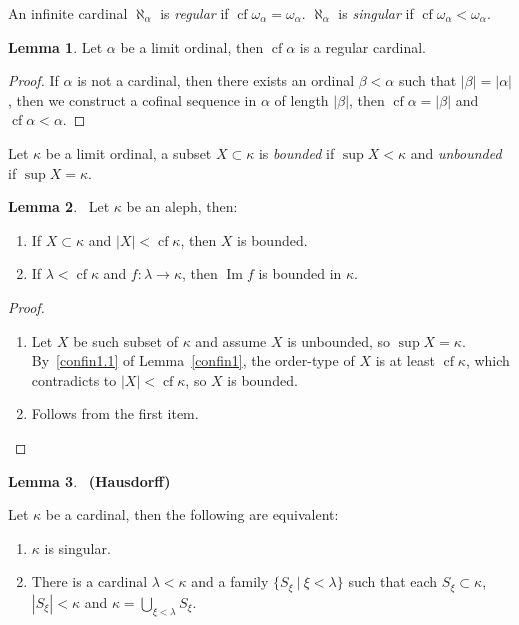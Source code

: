 \documentclass[8pt]{article}
\theoremstyle{definition}
\theoremstyle{definition}
\theoremstyle{definition}
\theoremstyle{definition}
\theoremstyle{definition}
\theoremstyle{definition}
\theoremstyle{definition}
\theoremstyle{definition}
\newtheorem{lemma}{Lemma}[section]
\theoremstyle{definition}
\theoremstyle{definition}
\theoremstyle{definition}
\theoremstyle{definition}
\theoremstyle{definition}
\theoremstyle{definition}
\theoremstyle{question}
\begin{document}
An infinite cardinal $\aleph_{\alpha}$ is \emph{regular} if $\operatorname{cf} \omega_{\alpha} = \omega_{\alpha}$.
$\aleph_{\alpha}$ is \emph{singular} if $\operatorname{cf} \omega_{\alpha} < \omega_{\alpha}$.

\begin{lemma}
  Let $\alpha$ be a limit ordinal, then $\operatorname{cf} \alpha$ is a regular cardinal.
\end{lemma}

\begin{proof}
  If $\alpha$ is not a cardinal, then there exists an ordinal $\beta < \alpha$ such that 
  $|\beta| = |\alpha|$, 
  then we construct a cofinal sequence in $\alpha$ of length $|\beta|$, then $\operatorname{cf} \alpha = |\beta|$ 
  and $\operatorname{cf} \alpha < \alpha$.
\end{proof}

Let $\kappa$ be a limit ordinal, a subset $X \subset \kappa$ is \emph{bounded} if $\sup X < \kappa$ and 
\emph{unbounded} if $\sup X = \kappa$.

\begin{lemma}~\label{boundedaleph} Let $\kappa$ be an aleph, then:

  \begin{enumerate}
    \item If $X \subset \kappa$ and $|X| < \operatorname{cf} \kappa$, then $X$ is bounded.
    \item If $\lambda < \operatorname{cf} \kappa$ and $f : \lambda \to \kappa$, 
    then $\operatorname{Im}f$ is bounded in $\kappa$.
  \end{enumerate}
\end{lemma}

\begin{proof}

  \begin{enumerate}
    \item Let $X$ be such subset of $\kappa$ and assume $X$ is unbounded, so $\sup X = \kappa$.
    By~\ref{confin1.1} of Lemma~\ref{confin1}, the order-type of $X$ is at least $\operatorname{cf} \kappa$, which contradicts to 
    $|X| < \operatorname{cf} \kappa$, so $X$ is bounded.
    \item  Follows from the first item.
  \end{enumerate}
\end{proof}

\begin{lemma}~\label{reg} {\bf (Hausdorff)}

  Let $\kappa$ be a cardinal, then the following are equivalent:

  \begin{enumerate}
    \item $\kappa$ is singular.
    \item There is a cardinal $\lambda < \kappa$ and a family $\{ S_{\xi} \: | \: \xi < \lambda \}$ such that
    each $S_{\xi} \subset \kappa$, $|S_{\xi}| < \kappa$ and $\kappa = \bigcup \limits_{\xi < \lambda} S_{\xi}$.
  \end{enumerate}

\end{lemma}
\end{document}
